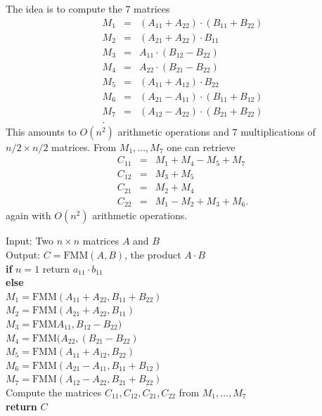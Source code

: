 The idea is to compute the $7$ matrices
\begin{eqnarray*}
  M_1 & = & (A_{11} + A_{22}) \cdot (B_{11}+ B_{22}) \\
  M_2 & = & (A_{21} + A_{22}) \cdot B_{11} \\
  M_3 & = & A_{11} \cdot (B_{12} - B_{22}) \\
  M_4 & = & A_{22} \cdot (B_{21} - B_{22}) \\
  M_5 & = & (A_{11} + A_{12})\cdot B_{22} \\
  M_6 & = & (A_{21}-A_{11}) \cdot (B_{11}+B_{12}) \\
  M_7 & = & (A_{12}-A_{22}) \cdot  (B_{21} + B_{22})\\. 
\end{eqnarray*}
This amounts to $O(n^2)$ arithmetic operations and $7$ multiplications of $n/2 × n/2$ matrices. From $M_1,\dots,M_7$ one can retrieve 
\begin{eqnarray*}
C_{11} & = & M_1 + M_4 - M_5 + M_7\\
C_{12} & = & M_3 + M_5 \\
C_{21} & = & M_2 + M_4\\
C_{22} & = & M_1 - M_2 + M_3 + M_6.  
\end{eqnarray*}
again with $O(n^2)$ arithmetic operations. 


\begin{algorithm}

  \begin{tabbing}
    Input: Two $n ×n$ matrices $A$ and $B$ \\
    Output: $C = \mathrm{FMM}(A,B)$, the product $ A\cdot B$ \\

    {\bf if}  $n=1$ return $a_{11} ⋅b_{11}$ \\
    {\bf else} \=  \\
               \>  $M_1 = \mathrm{FMM} (A_{11} + A_{22} , B_{11}+ B_{22}) $ \\
               \> $M_2 = \mathrm{FMM}(A_{21} + A_{22},  B_{11})$ \\
               \> $M_3  = \mathrm{FMM} A_{11} , B_{12} - B_{22}) $\\
               \> $M_4  = \mathrm{FMM}( A_{22} , (B_{21} - B_{22})$ \\
               \> $M_5  = \mathrm{FMM}(A_{11} + A_{12}, B_{22})$ \\
               \> $M_6  = \mathrm{FMM} (A_{21}-A_{11}, B_{11}+B_{12}) $\\
               \> $M_7  = \mathrm{FMM} (A_{12}-A_{22}, B_{21} + B_{22})$\\ 
               \> Compute the matrices $C_{11}, C_{12}, C_{21}, C_{22}$ from $M_1,\dots,M_7$ \\
               \> {\bf return} $C$
  \end{tabbing}
\end{algorithm}

